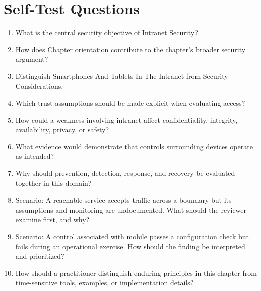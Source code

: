 \documentclass[11pt]{article}
\begin{document}
\section*{Self-Test Questions}
\begin{enumerate}
\item What is the central security objective of Intranet Security?
\item How does Chapter orientation contribute to the chapter's broader security argument?
\item Distinguish Smartphones And Tablets In The Intranet from Security Considerations.
\item Which trust assumptions should be made explicit when evaluating access?
\item How could a weakness involving intranet affect confidentiality, integrity, availability, privacy, or safety?
\item What evidence would demonstrate that controls surrounding devices operate as intended?
\item Why should prevention, detection, response, and recovery be evaluated together in this domain?
\item Scenario: A reachable service accepts traffic across a boundary but its assumptions and monitoring are undocumented. What should the reviewer examine first, and why?
\item Scenario: A control associated with mobile passes a configuration check but fails during an operational exercise. How should the finding be interpreted and prioritized?
\item How should a practitioner distinguish enduring principles in this chapter from time-sensitive tools, examples, or implementation details?
\end{enumerate}
\end{document}
